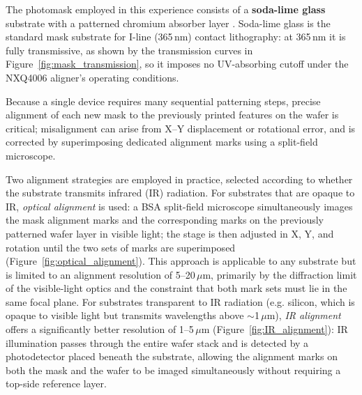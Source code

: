 The photomask employed in this experience consists of a
\textbf{soda-lime glass} substrate with a patterned chromium absorber
layer \cite{MitaniMicroMask}. Soda-lime glass is the standard mask
substrate for I-line (365\,nm) contact lithography: at 365\,nm it is
fully transmissive, as shown by the transmission curves in
Figure~\ref{fig:mask_transmission}, so it imposes no UV-absorbing
cutoff under the NXQ4006 aligner's operating conditions.

Because a single device requires many sequential patterning steps,
precise alignment of each new mask to the previously printed features
on the wafer is critical; misalignment can arise from X--Y
displacement or rotational error, and is corrected by superimposing
dedicated alignment marks using a split-field microscope.

Two alignment strategies are employed in practice, selected according
to whether the substrate transmits infrared (IR) radiation. For
substrates that are opaque to IR, \emph{optical alignment} is used: a
BSA split-field microscope simultaneously images the mask alignment
marks and the corresponding marks on the previously patterned wafer
layer in visible light; the stage is then adjusted in X, Y, and
rotation until the two sets of marks are superimposed
(Figure~\ref{fig:optical_alignment}). This approach is applicable to
any substrate but is limited to an alignment resolution of
5--20\,$\mu$m, primarily by the diffraction limit of the
visible-light optics and the constraint that both mark sets must lie
in the same focal plane. For substrates transparent to IR radiation
(e.g. silicon, which is opaque to visible light but transmits
wavelengths above $\sim$1\,$\mu$m), \emph{IR alignment} offers a
significantly better resolution of 1--5\,$\mu$m
(Figure~\ref{fig:IR_alignment}): IR illumination passes through the
entire wafer stack and is detected by a photodetector placed beneath
the substrate, allowing the alignment marks on both the mask and the
wafer to be imaged simultaneously without requiring a top-side reference layer.

